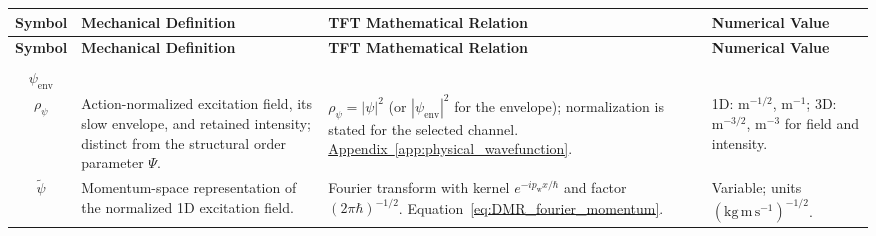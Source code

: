 \vspace{0.5cm}
\noindent
\renewcommand{\arraystretch}{1.6}
\begin{longtable}{@{} c p{5.5cm} p{4cm} p{3.5cm} @{}}
\toprule
\textbf{Symbol} & {\raggedright \textbf{Mechanical Definition}\par} & {\raggedright \textbf{TFT Mathematical Relation}\par} & {\raggedright \textbf{Numerical Value}\par} \\
\midrule
\endfirsthead

\toprule
\textbf{Symbol} & {\raggedright \textbf{Mechanical Definition}\par} & {\raggedright \textbf{TFT Mathematical Relation}\par} & {\raggedright \textbf{Numerical Value}\par} \\
\midrule
\endhead

\begin{tabular}[c]{@{}c@{}}$\psi$ \\ $\psi_{\mathrm{env}}$ \\ $\rho_\psi$\end{tabular} & {\raggedright Action-normalized excitation field, its slow envelope, and retained intensity; distinct from the structural order parameter $\Psi$.\par} & {\raggedright $\rho_\psi=|\psi|^2$ (or $|\psi_{\mathrm{env}}|^2$ for the envelope); normalization is stated for the selected channel. \newline \hyperref[app:physical_wavefunction]{Appendix~\ref*{app:physical_wavefunction}}.\par} & {\raggedright 1D: $\mathrm{m^{-1/2}}$, $\mathrm{m^{-1}}$; 3D: $\mathrm{m^{-3/2}}$, $\mathrm{m^{-3}}$ for field and intensity.\par} \\

$\widetilde\psi$ & {\raggedright Momentum-space representation of the normalized 1D excitation field.\par} & {\raggedright Fourier transform with kernel $e^{-ip_{\mathrm w}x/\hbar}$ and factor $(2\pi\hbar)^{-1/2}$. \newline Equation~\eqref{eq:DMR_fourier_momentum}.\par} & {\raggedright Variable; units $(\mathrm{kg\,m\,s^{-1}})^{-1/2}$.\par} \\


\end{longtable}
